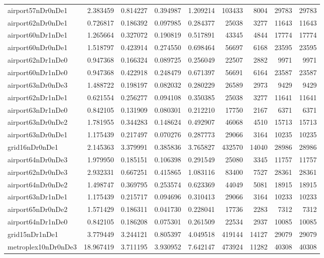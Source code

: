 \begin{longtable}{|l|r|r|r|r|r|r|r|r|}
airport57nDr0nDe1 & 2.383459 & 0.814227 & 0.394987 & 1.209214 & 103433 & 8004 & 29783 & 29783 \\
airport62nDr0nDe1 & 0.726817 & 0.186392 & 0.097985 & 0.284377 & 25038 & 3277 & 11643 & 11643 \\
airport60nDr1nDe1 & 1.265664 & 0.327072 & 0.190819 & 0.517891 & 43345 & 4844 & 17774 & 17774 \\
airport60nDr0nDe1 & 1.518797 & 0.423914 & 0.274550 & 0.698464 & 56697 & 6168 & 23595 & 23595 \\
airport62nDr1nDe0 & 0.947368 & 0.166324 & 0.089725 & 0.256049 & 22507 & 2882 & 9971 & 9971 \\
airport60nDr1nDe0 & 0.947368 & 0.422918 & 0.248479 & 0.671397 & 56691 & 6164 & 23587 & 23587 \\
airport63nDr0nDe3 & 1.488722 & 0.198197 & 0.082032 & 0.280229 & 26589 & 2973 & 9429 & 9429 \\
airport62nDr1nDe1 & 0.621554 & 0.256277 & 0.094108 & 0.350385 & 25038 & 3277 & 11641 & 11641 \\
airport63nDr1nDe0 & 0.842105 & 0.131909 & 0.080301 & 0.212210 & 17750 & 2167 & 6371 & 6371 \\
airport63nDr0nDe2 & 1.781955 & 0.344283 & 0.148624 & 0.492907 & 46068 & 4510 & 15713 & 15713 \\
airport63nDr0nDe1 & 1.175439 & 0.217497 & 0.070276 & 0.287773 & 29066 & 3164 & 10235 & 10235 \\
grid16nDr0nDe1 & 2.145363 & 3.379991 & 0.385836 & 3.765827 & 432570 & 14040 & 28986 & 28986 \\
airport64nDr0nDe3 & 1.979950 & 0.185151 & 0.106398 & 0.291549 & 25080 & 3345 & 11757 & 11757 \\
airport62nDr0nDe3 & 2.932331 & 0.667251 & 0.415865 & 1.083116 & 83400 & 7527 & 28361 & 28361 \\
airport64nDr0nDe2 & 1.498747 & 0.369795 & 0.253574 & 0.623369 & 44049 & 5081 & 18915 & 18915 \\
airport63nDr1nDe1 & 1.175439 & 0.215717 & 0.094696 & 0.310413 & 29066 & 3164 & 10233 & 10233 \\
airport65nDr0nDe2 & 1.571429 & 0.186311 & 0.041730 & 0.228041 & 17736 & 2283 & 7312 & 7312 \\
airport64nDr1nDe0 & 0.842105 & 0.186208 & 0.075301 & 0.261509 & 22534 & 2937 & 10085 & 10085 \\
grid15nDr1nDe1 & 3.779449 & 3.244121 & 0.805397 & 4.049518 & 419144 & 14127 & 29079 & 29079 \\
metroplex10nDr0nDe3 & 18.967419 & 3.711195 & 3.930952 & 7.642147 & 473924 & 11282 & 40308 & 40308 \\

\end{longtable}
